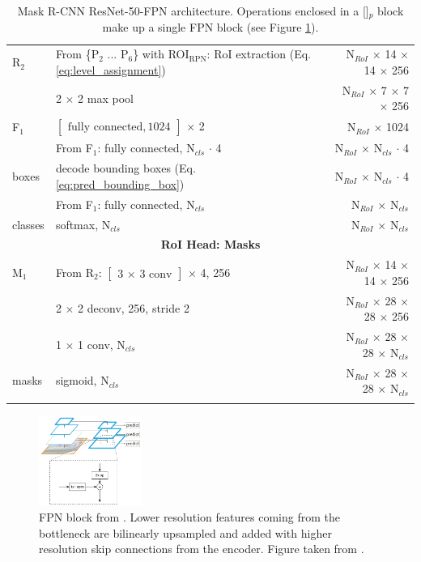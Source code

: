 {\begin{longtable}{llr}
\midrule
R$_2$ & From \{P$_2$ ... P$_6$\} with ROI$_{\mathrm{RPN}}$: RoI extraction (Eq. \ref{eq:level_assignment}) & N$_{RoI}$ $\times$ 14 $\times$ 14 $\times$ 256 \\
& 2 $\times$ 2 max pool & N$_{RoI}$ $\times$ 7 $\times$ 7 $\times$ 256 \\
F$_1$ & $\begin{bmatrix}\textrm{fully connected}, 1024\end{bmatrix}$ $\times$ 2 & N$_{RoI}$ $\times$ 1024 \\
& From F$_1$: fully connected, N$_{cls}$ $\cdot$ 4 & N$_{RoI}$ $\times$ N$_{cls}$ $\cdot$ 4 \\
boxes & decode bounding boxes (Eq. \ref{eq:pred_bounding_box}) & N$_{RoI}$ $\times$ N$_{cls}$ $\cdot$ 4\\
& From F$_1$: fully connected, N$_{cls}$ & N$_{RoI}$ $\times$ N$_{cls}$ \\
classes& softmax, N$_{cls}$ & N$_{RoI}$ $\times$ N$_{cls}$ \\
\midrule
\multicolumn{3}{c}{\textbf{RoI Head: Masks}}\\
\midrule
M$_1$ & From R$_2$: $\begin{bmatrix}\textrm{3 $\times$ 3 conv} \end{bmatrix}$ $\times$ 4, 256 & N$_{RoI}$ $\times$ 14 $\times$ 14 $\times$ 256 \\
& 2 $\times$ 2 deconv, 256, stride 2 & N$_{RoI}$ $\times$ 28 $\times$ 28 $\times$ 256 \\
& 1 $\times$ 1 conv, N$_{cls}$ & N$_{RoI}$ $\times$ 28 $\times$ 28 $\times$ N$_{cls}$ \\
masks & sigmoid, N$_{cls}$ & N$_{RoI}$ $\times$ 28 $\times$ 28 $\times$ N$_{cls}$ \\
\bottomrule

\caption {
Mask R-CNN \cite{MaskRCNN} ResNet-50-FPN \cite{ResNet} architecture.
Operations enclosed in a []$_p$ block make up a single FPN
block (see Figure \ref{figure:fpn_block}).
}
\label{table:maskrcnn_resnet_fpn}
\end{longtable}
}

\begin{figure}[t]
  \centering
  \includegraphics[width=0.3\textwidth]{figures/fpn}
\caption{
FPN block from \cite{FPN}.
Lower resolution features coming from the bottleneck are bilinearly upsampled
and added with higher resolution skip connections from the encoder.
Figure taken from \cite{FPN}.
}
\label{figure:fpn_block}
\end{figure}

